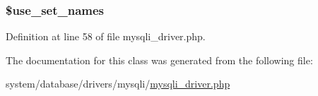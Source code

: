 \hypertarget{class_c_i___d_b__mysqli__driver_ac291b90d602cce25b980208dbc52be99}{
\subsubsection[{\$use\-\_\-set\-\_\-names}]{\setlength{\rightskip}{0pt plus 5cm}\$use\-\_\-set\-\_\-names}}\label{class_c_i___d_b__mysqli__driver_ac291b90d602cce25b980208dbc52be99}


Definition at line 58 of file mysqli\-\_\-driver.\-php.



The documentation for this class was generated from the following file\-:\begin{DoxyCompactItemize}
\item 
system/database/drivers/mysqli/\hyperlink{mysqli__driver_8php}{mysqli\-\_\-driver.\-php}\end{DoxyCompactItemize}
